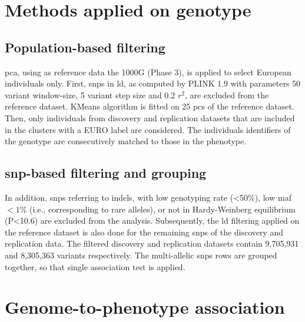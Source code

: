 \section{Methods applied on genotype}
\subsection{Population-based filtering}
\ac{pca}, using as reference data the 1000G (Phase 3), is applied to select European individuals only. First, \acp{snp} in \ac{ld}, as computed by PLINK 1.9 with parameters 50 variant window-size, 5 variant step size and 0.2 $r^2$, are excluded from the reference dataset. KMeans algorithm is fitted on 25 \acp{pc} of the reference dataset. Then, only individuals from discovery and replication datasets that are included in the clusters with a EURO label are considered. The individuals identifiers of the genotype are consecutively matched to those in the phenotype.

\subsection{\acs{snp}-based filtering and grouping}
\label{sub:snpbased_filt}
 In addition, \acp{snp} referring to indels, with low genotyping rate (<50\%), low \ac{maf} $<1\%$ (i.e., corresponding to rare alleles), or not in Hardy-Weinberg equilibrium (P<10.6) are excluded from the analysis. Subsequently, the \ac{ld} filtering applied on the reference dataset is also done for the remaining \acp{snp} of the discovery and replication data. The filtered discovery and replication datasets contain 9,705,931 and 8,305,363 variants respectively. The multi-allelic \acp{snp} rows are grouped together, so that single association test is applied.

\section{Genome-to-phenotype association}
